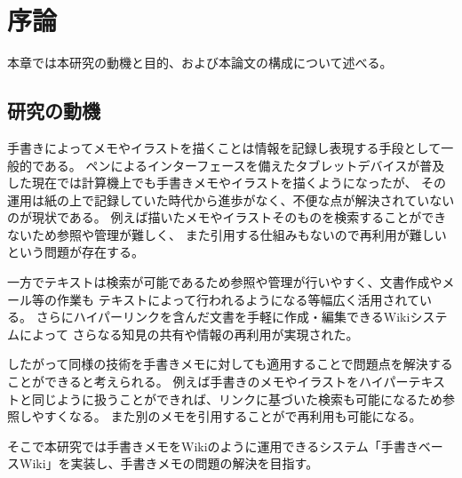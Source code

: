 \chapter{序論}
\label{chap:introduction}

本章では本研究の動機と目的、および本論文の構成について述べる。

\newpage

\section{研究の動機}
\label{douki}


手書きによってメモやイラストを描くことは情報を記録し表現する手段として一般的である。
ペンによるインターフェースを備えたタブレットデバイスが普及した現在では計算機上でも手書きメモやイラストを描くようになったが、
その運用は紙の上で記録していた時代から進歩がなく、不便な点が解決されていないのが現状である。
例えば描いたメモやイラストそのものを検索することができないため参照や管理が難しく、
また引用する仕組みもないので再利用が難しいという問題が存在する。

一方でテキストは検索が可能であるため参照や管理が行いやすく、文書作成やメール等の作業も
テキストによって行われるようになる等幅広く活用されている。
さらにハイパーリンクを含んだ文書を手軽に作成・編集できるWikiシステムによって
さらなる知見の共有や情報の再利用が実現された。

したがって同様の技術を手書きメモに対しても適用することで問題点を解決することができると考えられる。
例えば手書きのメモやイラストをハイパーテキストと同じように扱うことができれば、リンクに基づいた検索も可能になるため参照しやすくなる。
また別のメモを引用することがで再利用も可能になる。

そこで本研究では手書きメモをWikiのように運用できるシステム「手書きベースWiki」を実装し、手書きメモの問題の解決を目指す。


